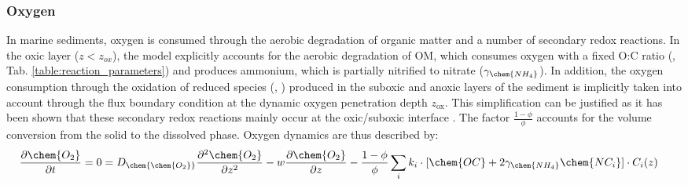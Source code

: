 \documentclass[gmd, manuscript]{copernicus}
\begin{document}
\subsubsection{Oxygen}
In marine sediments, oxygen is consumed through the aerobic degradation of organic matter and a number of secondary redox reactions. 
In the oxic layer ($z<z_{ox}$), the model explicitly accounts for the aerobic degradation of OM, which consumes oxygen with a fixed O:C ratio (, Tab. \ref{table:reaction_parameters}) 
and produces ammonium, which is partially nitrified to nitrate ($\gamma_\chem{NH_4}$).
In addition, the oxygen consumption through the oxidation of reduced species (, ) produced in the suboxic and anoxic layers of the sediment is implicitly taken into account 
through the flux boundary condition at the dynamic oxygen penetration depth $z_{\mathrm{ox}}$. This simplification can be justified as it has been shown that these secondary redox reactions mainly occur at the oxic/suboxic 
interface \citep{soetaert_model_1996}.  
The factor $\frac{1-\phi}{\phi}$ accounts for the volume conversion from the solid to the dissolved phase. 
Oxygen dynamics are thus described by:
\begin{align} 
 \frac{\partial \chem{O_2}}{\partial t} &= 0= D_{\chem{ \chem{O_2}}}\frac{\partial^2  \chem{O_2} }{\partial z^2} - w\frac{\partial  \chem{O_2}}{\partial z} - \frac{1-\phi}{\phi}\sum_i k_i \cdot [ \chem{OC} + 2 \gamma_{\chem{NH_4}} \chem{NC_i} ]\cdot C_{i}(z) \label{eq:ODE_O2_1}
\end{align}
\end{document}

